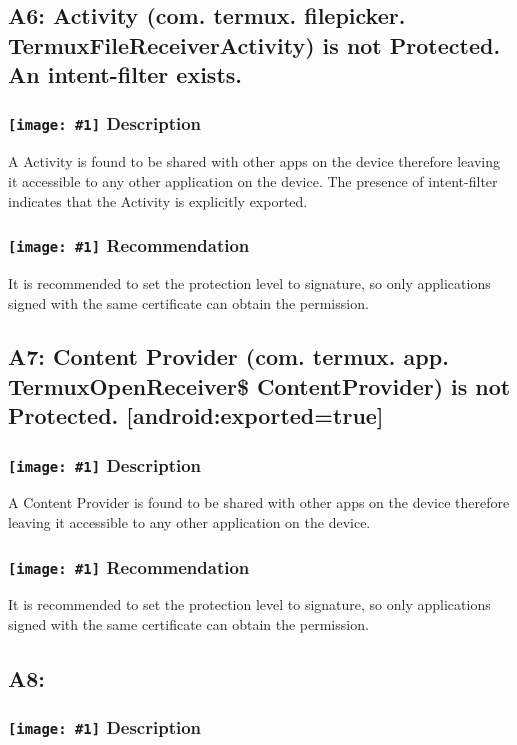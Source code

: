 \documentclass[12p]{article}
\newcommand{\icon}[1]{\texttt{[image: \#1]}}
\begin{document}
\subsection{A6: Activity (com. termux. filepicker. TermuxFileReceiverActivity) is not Protected. An intent-filter exists.}
\subsubsection*{\protect\icon{/home/miki/Documents/GITHUB/AndroidPermissions/python/vulns/report_icons/basic_sheet.png} Description}
A  Activity is found to be shared with other apps on the device therefore leaving it accessible to any other application on the device. The presence of intent-filter indicates that the Activity is explicitly exported.
\subsubsection*{\protect\icon{/home/miki/Documents/GITHUB/AndroidPermissions/python/vulns/report_icons/basic_todo.png} Recommendation}
It is recommended to set the protection level to signature, so only applications signed with the same certificate can obtain the permission.
\subsection{A7: Content Provider (com. termux. app. TermuxOpenReceiver\$ ContentProvider) is not Protected. [android:exported=true]}
\subsubsection*{\protect\icon{/home/miki/Documents/GITHUB/AndroidPermissions/python/vulns/report_icons/basic_sheet.png} Description}
A Content Provider is found to be shared with other apps on the device therefore leaving it accessible to any other application on the device.
\subsubsection*{\protect\icon{/home/miki/Documents/GITHUB/AndroidPermissions/python/vulns/report_icons/basic_todo.png} Recommendation}
It is recommended to set the protection level to signature, so only applications signed with the same certificate can obtain the permission.
\subsection{A8: }
\subsubsection*{\protect\icon{/home/miki/Documents/GITHUB/AndroidPermissions/python/vulns/report_icons/basic_sheet.png} Description}
\end{document}
